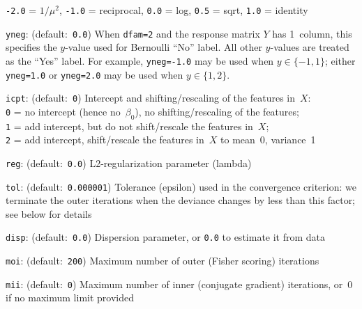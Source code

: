 \begin{Description}
{\tt -2.0} = $1/\mu^2$,
{\tt -1.0} = reciprocal,
{\tt 0.0} = log,
{\tt 0.5} = sqrt,
{\tt 1.0} = identity
\item[{\tt yneg}:] (default:\mbox{ }{\tt 0.0})
When {\tt dfam=2} and the response matrix $Y$ has 1~column,
this specifies the $y$-value used for Bernoulli ``No'' label.
All other $y$-values are treated as the ``Yes'' label.
For example, {\tt yneg=-1.0} may be used when $y\in\{-1, 1\}$;
either {\tt yneg=1.0} or {\tt yneg=2.0} may be used when $y\in\{1, 2\}$.
\item[{\tt icpt}:] (default:\mbox{ }{\tt 0})
Intercept and shifting/rescaling of the features in~$X$:\\
{\tt 0} = no intercept (hence no~$\beta_0$), no shifting/rescaling of the features;\\
{\tt 1} = add intercept, but do not shift/rescale the features in~$X$;\\
{\tt 2} = add intercept, shift/rescale the features in~$X$ to mean~0, variance~1
\item[{\tt reg}:] (default:\mbox{ }{\tt 0.0})
L2-regularization parameter (lambda)
\item[{\tt tol}:] (default:\mbox{ }{\tt 0.000001})
Tolerance (epsilon) used in the convergence criterion: we terminate the outer iterations
when the deviance changes by less than this factor; see below for details
\item[{\tt disp}:] (default:\mbox{ }{\tt 0.0})
Dispersion parameter, or {\tt 0.0} to estimate it from data
\item[{\tt moi}:] (default:\mbox{ }{\tt 200})
Maximum number of outer (Fisher scoring) iterations
\item[{\tt mii}:] (default:\mbox{ }{\tt 0})
Maximum number of inner (conjugate gradient) iterations, or~0 if no maximum
limit provided
\end{Description}


